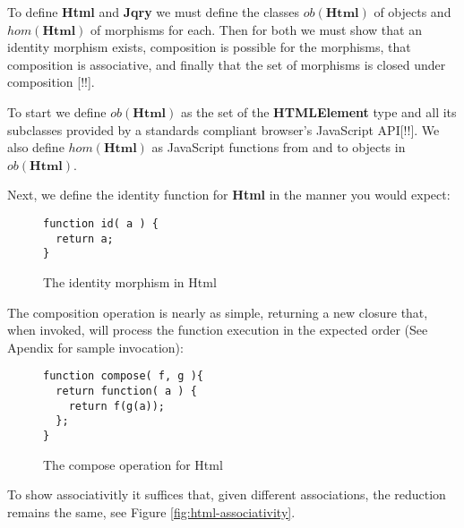 \documentclass[preprint,10pt]{sigplanconf}
\begin{document}
To define \textbf{Html} and \textbf{Jqry} we must define the classes \begin{math}ob(\mathbf{Html})\end{math} of objects and \begin{math}hom(\mathbf{Html})\end{math} of morphisms for each. Then for both we must show that an identity morphism exists, composition is possible for the morphisms, that composition is associative, and finally that the set of morphisms is closed under composition [!!].

To start we define \begin{math}ob(\mathbf{Html})\end{math} as the set of the \textbf{HTMLElement} type and all its subclasses provided by a standards compliant browser's JavaScript API[!!]. We also define \begin{math}hom(\mathbf{Html})\end{math} as JavaScript functions from and to objects in \begin{math}ob(\mathbf{Html})\end{math}.

Next, we define the identity function for \textbf{Html} in the manner you would expect:

\begin{figure}[h!]
\small
\begin{verbatim}
function id( a ) {
  return a;
}
\end{verbatim}
\nocaptionrule \caption{The identity morphism in Html}
\end{figure}

The composition operation is nearly as simple, returning a new closure that, when invoked, will process the function execution in the expected order (See Apendix for sample invocation):

\begin{figure}[h!]
\small
\begin{verbatim}
function compose( f, g ){
  return function( a ) {
    return f(g(a));
  };
}
\end{verbatim}
\nocaptionrule \caption{The compose operation for Html}
\end{figure}

To show associativitly it suffices that, given different associations, the reduction remains the same, see Figure \ref{fig:html-associativity}.
\end{document}
